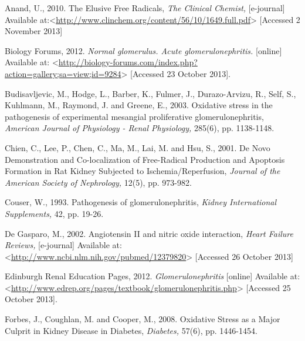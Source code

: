 \documentclass[11pt]{report}
\begin{document}
Anand, U., 2010. The Elusive Free Radicals, \textit{The Clinical Chemist,} [e-journal] Available at:<\url{http://www.clinchem.org/content/56/10/1649.full.pdf}> [Accessed 2 November 2013]
\newline
\newline

Biology Forums, 2012. \textit{Normal glomerulus. Acute glomerulonephritis.} [online] Available at: <\url{http://biology-forums.com/index.php?action=gallery;sa=view;id=9284}> [Accessed 23 October 2013].
\newline
\newline

Budisavljevic, M., Hodge, L., Barber, K., Fulmer, J., Durazo-Arvizu, R., Self, S., Kuhlmann, M., Raymond, J. and Greene, E., 2003. Oxidative stress in the pathogenesis of experimental mesangial proliferative glomerulonephritis, \textit{American Journal of Physiology - Renal Physiology,} 285(6), pp. 1138-1148.
\newline
\newline

Chien, C., Lee, P., Chen, C., Ma, M., Lai, M. and Hsu, S., 2001. De Novo Demonstration and Co-localization of Free-Radical Production and Apoptosis Formation in Rat Kidney Subjected to Ischemia/Reperfusion, \textit{Journal of the American Society of Nephrology,} 12(5), pp. 973-982.
\newline
\newline

Couser, W., 1993. Pathogenesis of glomerulonephritis, \textit{Kidney International Supplements,} 42, pp. 19-26.
\newline
\newline

De Gasparo, M., 2002. Angiotensin II and nitric oxide interaction, \textit{Heart Failure Reviews,} [e-journal] Available at:<\url{http://www.ncbi.nlm.nih.gov/pubmed/12379820}> [Accessed 26 October 2013]
\newline
\newline

Edinburgh Renal Education Pages, 2012. \textit{Glomerulonephritis} [online] Available at: <\url{http://www.edrep.org/pages/textbook/glomerulonephritis.php}> [Accessed 25 October 2013].
\newline
\newline

Forbes, J., Coughlan, M. and Cooper, M., 2008. Oxidative Stress as a Major Culprit in Kidney Disease in Diabetes, \textit{Diabetes,} 57(6), pp. 1446-1454.
\newline
\newline
\end{document}
